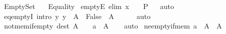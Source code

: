 %
\begin{isabellebody}%
%
%
\isadelimdocument
%
\endisadelimdocument
%
\isatagdocument
%
\isamarkuptrue%
%
\endisatagdocument
{\isafolddocument}%
%
\isadelimdocument
%
\endisadelimdocument
%
\isadelimtheory
%
\endisadelimtheory
%
\isatagtheory
{}\isamarkupfalse%
\ Empty{\isacharunderscore}{\kern0pt}Set\isanewline
\ \ \ Equality\isanewline
{}%
\endisatagtheory
{\isafoldtheory}%
%
\isadelimtheory
\isanewline
%
\endisadelimtheory
\isanewline
{}\isamarkupfalse%
\ emptyE\ {\isacharbrackleft}{\kern0pt}elim{\isacharbrackright}{\kern0pt}{\isacharcolon}{\kern0pt}\ {\isachardoublequoteopen}x\ {\isasymin}\ {\isacharbraceleft}{\kern0pt}{\isacharbraceright}{\kern0pt}\ {\isasymLongrightarrow}\ P{\isachardoublequoteclose}%
\isadelimproof
\ %
\endisadelimproof
%
\isatagproof
{}\isamarkupfalse%
\ auto%
\endisatagproof
{\isafoldproof}%
%
\isadelimproof
%
\endisadelimproof
\isanewline
\isanewline
{}\isamarkupfalse%
\ eq{\isacharunderscore}{\kern0pt}emptyI\ {\isacharbrackleft}{\kern0pt}intro{\isacharbrackright}{\kern0pt}{\isacharcolon}{\kern0pt}\ {\isachardoublequoteopen}{\isasymlbrakk}{\isasymAnd}y{\isachardot}{\kern0pt}\ y\ {\isasymin}\ A\ {\isasymLongrightarrow}\ False{\isasymrbrakk}\ {\isasymLongrightarrow}\ A\ {\isacharequal}{\kern0pt}\ {\isacharbraceleft}{\kern0pt}{\isacharbraceright}{\kern0pt}{\isachardoublequoteclose}\isanewline
%
\isadelimproof
\ \ %
\endisadelimproof
%
\isatagproof
{}\isamarkupfalse%
\ auto%
\endisatagproof
{\isafoldproof}%
%
\isadelimproof
\isanewline
%
\endisadelimproof
\isanewline
{}\isamarkupfalse%
\ not{\isacharunderscore}{\kern0pt}mem{\isacharunderscore}{\kern0pt}if{\isacharunderscore}{\kern0pt}empty\ {\isacharbrackleft}{\kern0pt}dest{\isacharbrackright}{\kern0pt}{\isacharcolon}{\kern0pt}\ {\isachardoublequoteopen}A\ {\isacharequal}{\kern0pt}\ {\isacharbraceleft}{\kern0pt}{\isacharbraceright}{\kern0pt}\ {\isasymLongrightarrow}\ a\ {\isasymnotin}\ A{\isachardoublequoteclose}\isanewline
%
\isadelimproof
\ \ %
\endisadelimproof
%
\isatagproof
{}\isamarkupfalse%
\ auto%
\endisatagproof
{\isafoldproof}%
%
\isadelimproof
\isanewline
%
\endisadelimproof
\isanewline
{}\isamarkupfalse%
\ ne{\isacharunderscore}{\kern0pt}empty{\isacharunderscore}{\kern0pt}if{\isacharunderscore}{\kern0pt}mem{\isacharcolon}{\kern0pt}\ {\isachardoublequoteopen}a\ {\isasymin}\ A\ {\isasymLongrightarrow}\ A\ {\isasymnoteq}\ {\isacharbraceleft}{\kern0pt}{\isacharbraceright}{\kern0pt}{\isachardoublequoteclose}\isanewline

\end{isabellebody}
